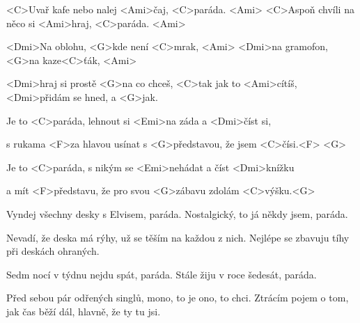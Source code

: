 
 \zs

<C>Uvař kafe nebo nalej <Ami>čaj, <C>paráda. <Ami>
<C>Aspoň chvíli na něco si <Ami>hraj, <C>paráda. <Ami>

<Dmi>Na oblohu, <G>kde není <C>mrak, <Ami>
<Dmi>na gramofon, <G>na kaze<C>ťák, <Ami>

<Dmi>hraj si prostě <G>na co chceš, <C>tak jak to <Ami>cítíš,
<Dmi>přidám se hned, a <G>jak. 

\ks
\zr

Je to <C>paráda, lehnout si <Emi>na záda a <Dmi>číst si,

s rukama <F>za hlavou usínat s <G>představou, že jsem <C>čísi.<F> <G> 

Je to <C>paráda, s nikým se <Emi>nehádat a číst <Dmi>knížku
 
a mít <F>představu, že pro svou <G>zábavu zdolám <C>výšku.<G> 

\kr
\zs

Vyndej všechny desky s Elvisem, paráda. 
Nostalgický, to já někdy jsem, paráda.

Nevadí, že deska má rýhy, už se těším na každou z nich. 
Nejlépe se zbavuju tíhy 
při deskách ohraných. 

\ks
\zr \kr
\zs

Sedm nocí v týdnu nejdu spát, paráda. 
Stále žiju v roce šedesát, paráda. 

Před sebou pár odřených singlů, mono, to je ono, to chci. 
Ztrácím pojem o tom, jak čas běží dál, hlavně, že ty tu jsi. 

\ks
\zr \kr

\kp
